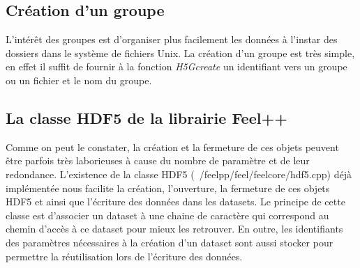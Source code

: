 \documentclass[12pt]{article}
\begin{document}
\subsection {Création d'un groupe}
L'intérêt des groupes est d'organiser plus facilement les données à l'instar des dossiers dans le système de fichiers Unix. La création d'un groupe est très simple, en effet il suffit de fournir à la fonction \emph{H5Gcreate} un identifiant vers un groupe ou un fichier et le nom du groupe.
\subsection {La classe HDF5 de la librairie Feel++}
Comme on peut le constater, la création et la fermeture de ces objets peuvent être parfois très laborieuses à cause du nombre de paramètre et de leur redondance. L'existence de la classe HDF5 (~/feelpp/feel/feelcore/hdf5.cpp) déjà implémentée nous facilite la création, l'ouverture, la fermeture de ces objets HDF5 et ainsi que l'écriture des données dans les datasets. Le principe de cette classe est d'associer un dataset à une chaine de caractère qui correspond au chemin d'accès à ce dataset pour mieux les retrouver. En outre, les identifiants des paramètres nécessaires à la création d'un dataset sont aussi stocker pour permettre la réutilisation lors de l'écriture des données.\newline
\end{document}
